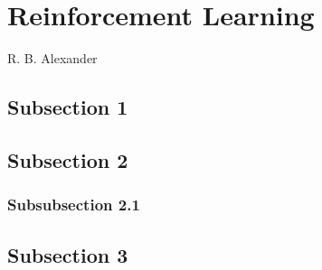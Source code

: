 \documentclass[10pt,letterpaper]{article}
\begin{document}
		
	
	\section*{\sf \textbf{Reinforcement Learning}}
	\vspace*{-0.1 in}
	{\noindent \sf \large R. B. Alexander}
	
	\vspace*{0.2 in}
	
\begin{adjustwidth}{1cm}{1cm}
		
	\noindent \textbf{}%
	
\end{adjustwidth}
					
	\subsection*{\sf \textbf{Subsection 1}}
	
	\subsection*{\sf \textbf{Subsection 2}}
	
	\subsubsection*{\sf \textbf{Subsubsection 2.1}}
		
	\subsection*{\sf \textbf{Subsection 3}}
\end{document}
